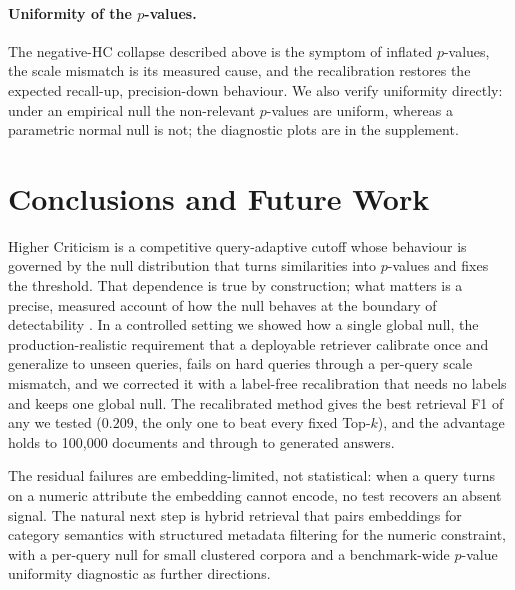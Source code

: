 \documentclass[letterpaper]{article} %
\newcommand{\AlgHCF}{0.209}\newcommand{\AlgHCK}{34.0}\newcommand{\AlgBJF}{0.202}
\begin{document}
\paragraph{Uniformity of the $p$-values.} The negative-HC collapse
described above is the symptom of inflated $p$-values, the scale mismatch
is its measured cause, and the recalibration restores the expected
recall-up, precision-down behaviour. We also verify uniformity directly:
under an empirical null the non-relevant $p$-values are uniform, whereas
a parametric normal null is not; the diagnostic plots are in the
supplement.

\section{Conclusions and Future Work}
Higher Criticism is a competitive query-adaptive cutoff whose behaviour
is governed by the null distribution that turns similarities into
$p$-values and fixes the threshold. That dependence is true by
construction; what matters is a precise, measured account of how the null
behaves at the boundary of detectability \citep{donohojin2004hc}. In a
controlled setting we showed how a single global null, the
production-realistic requirement that a deployable retriever calibrate
once and generalize to unseen queries, fails on hard queries through a
per-query scale mismatch, and we corrected it with a label-free
recalibration that needs no labels and keeps one global null. The
recalibrated method gives the best retrieval F1 of any we tested
($\AlgHCF$, the only one to beat every fixed Top-$k$), and the advantage
holds to 100{,}000 documents and through to generated answers.

The residual failures are embedding-limited, not statistical: when a
query turns on a numeric attribute the embedding cannot encode, no test
recovers an absent signal. The natural next step is hybrid retrieval that
pairs embeddings for category semantics with structured metadata
filtering for the numeric constraint, with a per-query null for small
clustered corpora and a benchmark-wide $p$-value uniformity diagnostic as
further directions.

\end{document}
